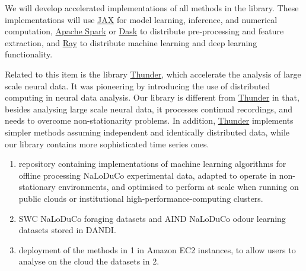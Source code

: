 

We will develop accelerated implementations of all methods in the library.
These implementations will use \href{https://docs.jax.dev/}{JAX} for model
learning, inference, and numerical computation,
\href{https://spark.apache.org/}{Apache Spark} or
\href{https://www.dask.org/}{Dask} to distribute pre-processing and feature
extraction, and \href{https://docs.ray.io/}{Ray} to distribute machine learning
and deep learning functionality.

Related to this item is the library
\href{https://github.com/thunder-project/thunder}{Thunder}, which accelerate the
analysis of large scale neural data. It was pioneering by introducing the use
of distributed computing in neural data analysis.
%
Our library is different from
\href{https://github.com/thunder-project/thunder}{Thunder} in that, besides
analysing large scale neural data, it processes continual recordings, and needs
to overcome non-stationarity problems.
%
%
In addition, \href{https://github.com/thunder-project/thunder}{Thunder}
implements simpler methods assuming independent and identically distributed
data, while our library contains more sophisticated time series ones.

\label{sec:deliverablesOfflineAnalysis}

\begin{enumerate}

    \item repository containing implementations of machine learning algorithms
        for offline processing NaLoDuCo experimental data, adapted to operate
        in non-stationary environments, and optimised to perform at scale when
        running on public clouds or institutional
        high-performance-computing clusters.

    \item SWC NaLoDuCo foraging datasets and AIND NaLoDuCo odour learning
    datasets stored in DANDI.

    \item deployment of the methods in 1 in Amazon EC2 instances, to allow
        users to analyse on the cloud the datasets in 2.

\end{enumerate}

